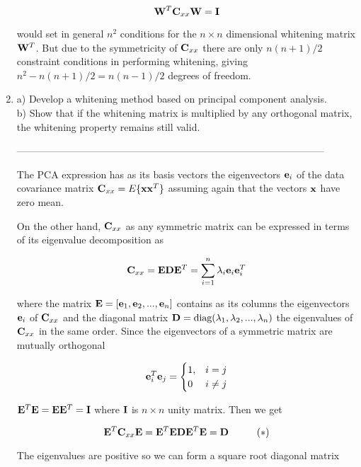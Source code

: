 \documentclass[10pt]{article}
\begin{document}
\begin{enumerate}
\[
\mathbf{W}^T\mathbf{C}_{xx}\mathbf{W}=\mathbf{I}
\]

would set in general $n^2$ conditions for the $n\times n$ dimensional whitening
matrix $\mathbf{W}^T$. But due to the symmetricity of $\mathbf{C}_{xx}$ there are
only $n(n+1)/2$ constraint conditions in performing whitening, giving
$n^2-n(n+1)/2=n(n-1)/2$ degrees of freedom.

\vspace{2mm}

\vspace{2cm}
\item a) Develop a whitening method based on principal component analysis.\\
b) Show that if the whitening matrix is multiplied by any orthogonal
matrix, the whitening property remains still valid.

---------------------------------------------------------------------------------------------

The PCA expression has as its basis vectors the eigenvectors
$\mathbf{e}_i$ of the data covariance matrix $\mathbf{C}_{xx}=E\lbrace
\mathbf{x}\mathbf{x}^T\rbrace$ assuming again that the vectors $\mathbf{x}$
have zero mean.

On the other hand, $\mathbf{C}_{xx}$ as any symmetric matrix can be expressed
in terms of its eigenvalue decomposition as

\[
\mathbf{C}_{xx} = \mathbf{E}\mathbf{D}\mathbf{E}^T = \sum_{i=1}^{n} \lambda_i \mathbf{e}_i \mathbf{e}_i^T
\]

where the matrix $\mathbf{E}=\left[ \mathbf{e}_1, \mathbf{e}_2, ...,
  \mathbf{e}_n \right]$ contains as its columns the
eigenvectors $\mathbf{e}_i$ of $\mathbf{C}_{xx}$ and the diagonal matrix $\mathbf{D}=\text{diag}(\lambda_1,
\lambda_2, ..., \lambda_n)$ the eigenvalues of $\mathbf{C}_{xx}$ in the same
order. Since the eigenvectors of a symmetric matrix are mutually
orthogonal

\[
\mathbf{e}_i^T\mathbf{e}_j = \begin{cases}1, &i=j\\0 &i\neq
j\end{cases}
\]


$\mathbf{E}^T\mathbf{E} = \mathbf{E}\mathbf{E}^T = \mathbf{I}$ where $\mathbf{I}$ is $n\times n$ unity matrix. Then we get

\[
\mathbf{E}^T\mathbf{C}_{xx}\mathbf{E} =
\mathbf{E}^T\mathbf{E}\mathbf{D}\mathbf{E}^T\mathbf{E} = \mathbf{D} \hspace{1cm} (*)
\]

The eigenvalues are positive so we can form a square root diagonal matrix


\end{enumerate}
\end{document}
